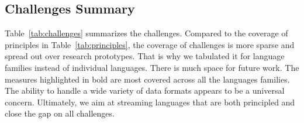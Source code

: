 \subsection{Challenges Summary}

Table~\ref{tab:challenges} summarizes the challenges.  Compared to the
coverage of principles in Table~\ref{tab:principles}, the coverage of
challenges is more sparse and spread out over research prototypes.
That is why we tabulated it for language families instead of
individual languages.  There is much space for future work. The
measures highlighted in bold are most covered across all the languages
families.  The ability to handle a wide variety of data formats
appears to be a universal concern.
Ultimately, we aim at streaming languages that are
both principled and close the gap on all challenges.
